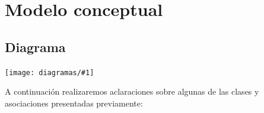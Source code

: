 \documentclass[a4paper, 10pt, twoside]{article}
\newcommand{\diagramah}[1]{%
  \texttt{[image: diagramas/\#1]}%
}
\newcounter{usecasecounter}
\newcounter{usecasealtcounter}
\newcounter{nroCU}
\newcommand{\ucname}[1]{\renewcommand{\givenucname}{#1}}
\newcommand{\ucpre}[1]{\renewcommand{\givenucpre}{#1}}
\newcommand{\ucpost}[1]{\renewcommand{\givenucpost}{#1}}
\newcommand{\ucactor}[1]{\renewcommand{\givenucactor}{#1}}
\newcommand{\givenucname}{REQUIRED!}
\newcommand{\givenucpre}{REQUIRED!}
\newcommand{\givenucpost}{REQUIRED!}
\newcommand{\givenucactor}{REQUIRED!}
\newenvironment{usecase}
  {}{
    \stepcounter{nroCU}
    \textbf{Caso de uso \arabic{nroCU}: }\givenucname \\
    \textbf{Pre: }\givenucpre \\
    \textbf{Post: }\givenucpost \\
    \textbf{Actores: }\givenucactor
  }
\newenvironment{usecasesteps}
  {
    \setcounter{usecasecounter}{0}
    \setcounter{usecasealtcounter}{0}

    \tabularx{\textwidth}{|l|X|}
    \hline
    Curso normal & Curso alternativo \\
    \hline
    \hline
  }{
    \endtabularx
    \vspace{\parskip}
  }
\newcommand{\ucstep}[2]{
  \stepcounter{usecasecounter}%
  \parbox[t]{7.5cm}{
    \makebox[2ex][l]{\arabic{usecasecounter}.}
    #1\phantom{p}
  }
  &
  \parbox[t]{7.5cm}{
    \setcounter{usecasealtcounter}{0}
    #2\phantom{p}
  } \\
  \hline
}
\begin{document}





\section{Modelo conceptual}


\subsection{Diagrama}

\diagramah{conceptual}

A continuación realizaremos aclaraciones sobre algunas de las clases y asociaciones presentadas previamente:
\end{document}
